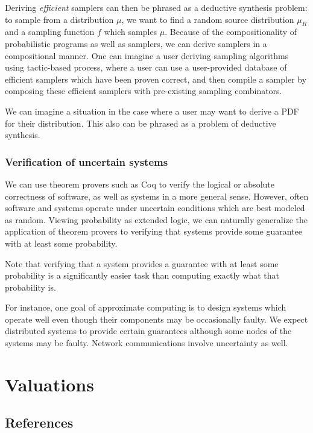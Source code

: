 Deriving \emph{efficient} samplers can then be phrased as a deductive synthesis problem: to sample from a distribution $\mu$, we want to find a random source distribution $\mu_R$ and a sampling function $f$ which samples $\mu$. Because of the compositionality of probabilistic programs as well as samplers, we can derive samplers in a compositional manner. One can imagine a user deriving sampling algorithms using tactic-based process, where a user can use a user-provided database of efficient samplers which have been proven correct, and then compile a sampler by composing these efficient samplers with pre-existing sampling combinators.

We can imagine a situation in the case where a user may want to derive a PDF for their distribution. This also can be phrased as a problem of deductive synthesis.

\subsubsection{Verification of uncertain systems}

We can use theorem provers such as Coq to verify the logical or absolute correctness of software, as well as systems in a more general sense. However, often software and systems operate under uncertain conditions which are best modeled as random. Viewing probability as extended logic, we can naturally generalize the application of theorem provers to verifying that systems provide some guarantee with at least some probability. 

Note that verifying that a system provides a guarantee with at least some probability is a significantly easier task than computing exactly what that probability is.

For instance, one goal of approximate computing is to design systems which operate well even though their components may be occasionally faulty. We expect distributed systems to provide certain guarantees although some nodes of the systems may be faulty. Network communications involve uncertainty as well.

\section{Valuations}

\subsection{References}

